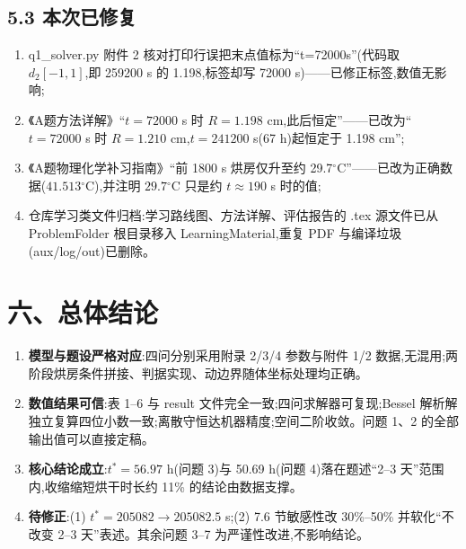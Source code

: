 \documentclass[12pt,a4paper]{ctexart}
\newcommand{\dg}{\ensuremath{^\circ}}
\begin{document}
\subsection{5.3 本次已修复}

\begin{enumerate}[label=(\arabic*),leftmargin=2.5em]
\item q1\_solver.py 附件 2 核对打印行误把末点值标为``t=72000s''(代码取 $d_2[-1,1]$,即 259200 s 的 1.198,标签却写 72000 s)——已修正标签,数值无影响;
\item 《A题方法详解》``$t=72000$ s 时 $R=1.198$ cm,此后恒定''——已改为``$t=72000$ s 时 $R=1.210$ cm,$t=241200$ s(67 h)起恒定于 1.198 cm'';
\item 《A题物理化学补习指南》``前 1800 s 烘房仅升至约 29.7\dg C''——已改为正确数据($41.513\dg$C),并注明 $29.7\dg$C 只是约 $t\approx190$ s 时的值;
\item 仓库学习类文件归档:学习路线图、方法详解、评估报告的 .tex 源文件已从 ProblemFolder 根目录移入 LearningMaterial,重复 PDF 与编译垃圾(aux/log/out)已删除。
\end{enumerate}

\section{六、总体结论}

\begin{enumerate}[label=(\arabic*),leftmargin=2.5em]
\item \textbf{模型与题设严格对应}:四问分别采用附录 2/3/4 参数与附件 1/2 数据,无混用;两阶段烘房条件拼接、判据实现、动边界随体坐标处理均正确。
\item \textbf{数值结果可信}:表 1--6 与 result 文件完全一致;四问求解器可复现;Bessel 解析解独立复算四位小数一致;离散守恒达机器精度;空间二阶收敛。问题 1、2 的全部输出值可以直接定稿。
\item \textbf{核心结论成立}:$t^*=56.97$ h(问题 3)与 50.69 h(问题 4)落在题述``2--3 天''范围内,收缩缩短烘干时长约 11\% 的结论由数据支撑。
\item \textbf{待修正}:(1) $t^*=205082\to205082.5$ s;(2) 7.6 节敏感性改 30\%--50\% 并软化``不改变 2--3 天''表述。其余问题 3--7 为严谨性改进,不影响结论。
\end{enumerate}
\end{document}
